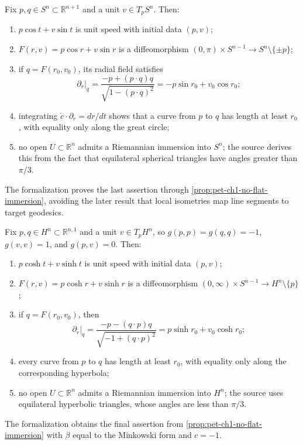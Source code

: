 \begin{remark}
  \label{rem:pet-ch1-ex-20}
  \leanok
  Fix $p,q\in S^n\subset\mathbb{R}^{n+1}$ and a unit
  $v\in T_pS^n$. Then:
  \begin{enumerate}
    \item $p\cos t+v\sin t$ is unit speed with initial data $(p,v)$;
    \item
      $F(r,v)=p\cos r+v\sin r$ is a diffeomorphism
      $(0,\pi)\times S^{n-1}\to S^n\setminus\{\pm p\}$;
    \item if $q=F(r_0,v_0)$, its radial field satisfies
      \[
        \partial_r|_q
          =\frac{-p+(p\cdot q)q}{\sqrt{1-(p\cdot q)^2}}
          =-p\sin r_0+v_0\cos r_0;
      \]
    \item integrating $\dot c\cdot\partial_r=dr/dt$ shows that a curve from
      $p$ to $q$ has length at least $r_0$, with equality only along the
      great circle;
    \item no open $U\subset\mathbb{R}^n$ admits a Riemannian immersion into
      $S^n$; the source derives this from the fact that equilateral spherical
      triangles have angles greater than $\pi/3$.
  \end{enumerate}
  The formalization proves the last assertion through
  \cref{prop:pet-ch1-no-flat-immersion}, avoiding the later result that local
  isometries map line segments to target geodesics.
\end{remark}

\begin{remark}
  \label{rem:pet-ch1-ex-21}
  \leanok
  Fix $p,q\in H^n\subset\mathbb{R}^{n,1}$ and a unit
  $v\in T_pH^n$, so $g(p,p)=g(q,q)=-1$, $g(v,v)=1$, and $g(p,v)=0$. Then:
  \begin{enumerate}
    \item $p\cosh t+v\sinh t$ is unit speed with initial data $(p,v)$;
    \item
      $F(r,v)=p\cosh r+v\sinh r$ is a diffeomorphism
      $(0,\infty)\times S^{n-1}\to H^n\setminus\{p\}$;
    \item if $q=F(r_0,v_0)$, then
      \[
        \partial_r|_q
          =\frac{-p-(q\cdot p)q}{\sqrt{-1+(q\cdot p)^2}}
          =p\sinh r_0+v_0\cosh r_0;
      \]
    \item every curve from $p$ to $q$ has length at least $r_0$, with equality
      only along the corresponding hyperbola;
    \item no open $U\subset\mathbb{R}^n$ admits a Riemannian immersion into
      $H^n$; the source uses equilateral hyperbolic triangles, whose angles are
      less than $\pi/3$.
  \end{enumerate}
  The formalization obtains the final assertion from
  \cref{prop:pet-ch1-no-flat-immersion} with $\beta$ equal to the Minkowski
  form and $c=-1$.
\end{remark}

